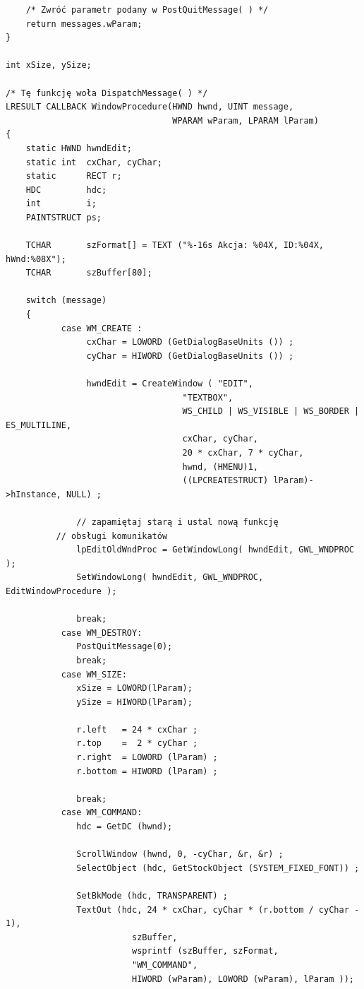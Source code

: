 \begin{scriptsize}
\begin{verbatim}
    /* Zwróć parametr podany w PostQuitMessage( ) */
    return messages.wParam;
}

int xSize, ySize;

/* Tę funkcję woła DispatchMessage( ) */
LRESULT CALLBACK WindowProcedure(HWND hwnd, UINT message, 
                                 WPARAM wParam, LPARAM lParam)
{
    static HWND hwndEdit;
    static int  cxChar, cyChar;  
    static      RECT r;
    HDC         hdc; 
    int         i;
    PAINTSTRUCT ps;

    TCHAR       szFormat[] = TEXT ("%-16s Akcja: %04X, ID:%04X, hWnd:%08X");
    TCHAR       szBuffer[80];
    
    switch (message)                  
    {
           case WM_CREATE :
                cxChar = LOWORD (GetDialogBaseUnits ()) ;
                cyChar = HIWORD (GetDialogBaseUnits ()) ;
          
                hwndEdit = CreateWindow ( "EDIT", 
                                   "TEXTBOX",
                                   WS_CHILD | WS_VISIBLE | WS_BORDER | ES_MULTILINE,
                                   cxChar, cyChar,
                                   20 * cxChar, 7 * cyChar,
                                   hwnd, (HMENU)1,
                                   ((LPCREATESTRUCT) lParam)->hInstance, NULL) ;

              // zapamiętaj starą i ustal nową funkcję
	      // obsługi komunikatów
              lpEditOldWndProc = GetWindowLong( hwndEdit, GWL_WNDPROC );
              SetWindowLong( hwndEdit, GWL_WNDPROC, EditWindowProcedure );
                                                                      
              break;
           case WM_DESTROY:
              PostQuitMessage(0);        
              break;
           case WM_SIZE:
              xSize = LOWORD(lParam); 
              ySize = HIWORD(lParam); 
              
              r.left   = 24 * cxChar ;
              r.top    =  2 * cyChar ;
              r.right  = LOWORD (lParam) ;
              r.bottom = HIWORD (lParam) ;
              
              break;   
           case WM_COMMAND:
              hdc = GetDC (hwnd);
     
              ScrollWindow (hwnd, 0, -cyChar, &r, &r) ;              
              SelectObject (hdc, GetStockObject (SYSTEM_FIXED_FONT)) ;
          
              SetBkMode (hdc, TRANSPARENT) ;
              TextOut (hdc, 24 * cxChar, cyChar * (r.bottom / cyChar - 1),
                         szBuffer,
                         wsprintf (szBuffer, szFormat,
                         "WM_COMMAND",
                         HIWORD (wParam), LOWORD (wParam), lParam ));


\end{verbatim}
\end{scriptsize}
